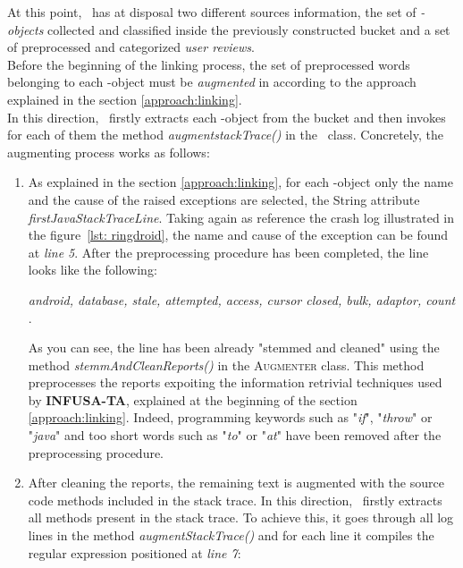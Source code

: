 At this point, \toolname\ has at disposal two different sources information, \ie the set of \textit{\Crash-objects }collected and classified inside the previously constructed bucket and a set of preprocessed and categorized \textit{user reviews}. \\
Before the beginning of the linking process, the set of preprocessed words belonging to each \Crash-object must be \textit{augmented} in according to the approach explained in the section \ref{approach:linking}. \\
In this direction, \toolname\ firstly extracts each \Crash-object from the bucket and then invokes for each of them the method 
\textit{augmentstackTrace()} in the \Crash\ class. 
Concretely, the augmenting process works as follows: 
\begin{enumerate}
\item As explained in the section \ref{approach:linking}, for each \Crash-object only the name and the cause of the raised exceptions are selected, \ie the String attribute \textit{firstJavaStackTraceLine}. Taking again as reference the crash log illustrated in the figure~\ref{lst: ringdroid}, the name and cause of the exception can be found at \textit{line 5}. 
After the preprocessing procedure has been completed, the line looks like the following: 
\begin{center}
\smallbreak
\emph{\small android, database, stale, attempted, access, cursor closed, bulk, adaptor, count }. 
\end{center} 
As you can see, the line has been already "stemmed and cleaned" using the method \textit{stemmAndCleanReports()} in the \textsc{Augmenter} class. 
This method preprocesses the reports expoiting the information retrivial techniques used by \textbf{INFUSA-TA}, explained at the beginning of the section \ref{approach:linking}.
Indeed, programming keywords such as "\textit{if}", "\textit{throw}" or "\textit{java}" and too short words such as "\textit{to}" or "\textit{at}" have been removed after the preprocessing procedure. 
\item After cleaning the reports, the remaining text is augmented with the source code methods included in the stack trace. In this direction, \toolname\ firstly extracts all methods present in the stack trace. To achieve this, it goes through all log lines in the method \textit{augmentStackTrace()} and for each line it compiles the regular expression positioned at \textit{line 7}: 
\begin{lstlisting}[caption=Regular expression for extracting all methods from a stack trace,label={lst: augmentstack}]

\end{lstlisting}
\end{enumerate}
